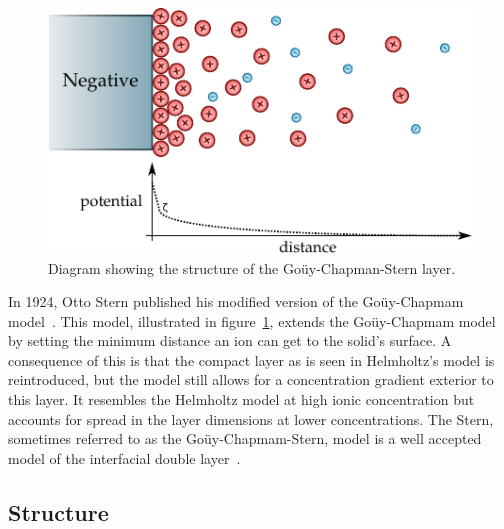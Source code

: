     \begin{figure}
      \begin{center}
        \includegraphics{content/introduction/graphics/model_stern}
      \end{center}
      \caption{Diagram showing the structure of the Goüy-Chapman-Stern layer.}
      \label{fig:doubleLayerModel_stern}
    \end{figure}
    In 1924, Otto Stern published his modified version of the Goüy-Chapmam model~\cite{Stern1924}.
    This model, illustrated in figure~\ref{fig:doubleLayerModel_stern}, extends the Goüy-Chapmam model by setting the minimum distance an ion can get to the solid's surface.
    A consequence of this is that the compact layer as is seen in Helmholtz's model is reintroduced, but the model still allows for a concentration gradient exterior to this layer.
    It resembles the Helmholtz model at high ionic concentration but accounts for spread in the layer dimensions at lower concentrations.
    The Stern, sometimes referred to as the Goüy-Chapmam-Stern, model is a well accepted model of the interfacial double layer~\cite{Olthuis2005}.



  \subsection{Structure}
    \label{sub:background_doubleLayers_anatomy}


